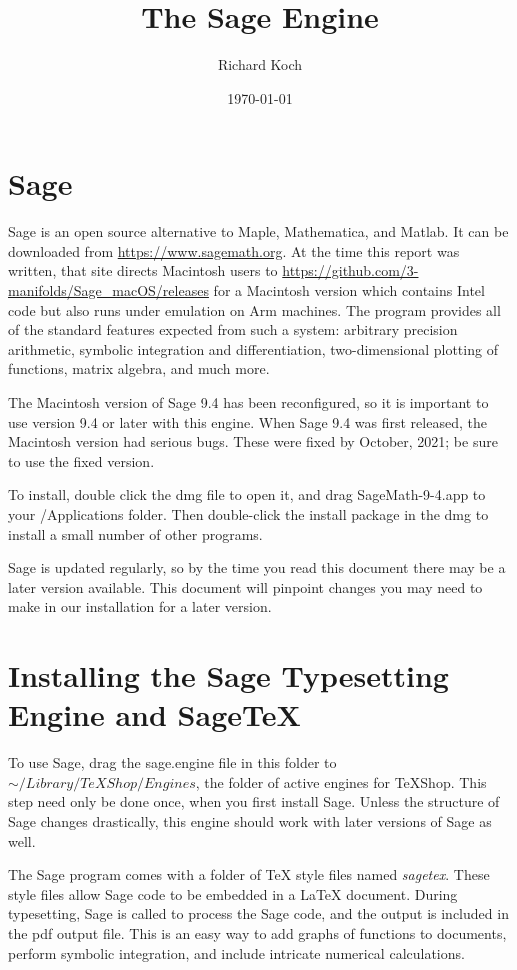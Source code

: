 \documentclass[11pt, oneside]{amsart}
\title{The Sage Engine}
\author{Richard Koch}
\date{\today}
\begin{document}
\maketitle
\vspace{-.3in}
\section{Sage}
Sage is an open source alternative to Maple, Mathematica, and Matlab. It can be downloaded from \url{https://www.sagemath.org}.
At the time this report was written, that site directs Macintosh users to   
\url{https://github.com/3-manifolds/Sage_macOS/releases} for a Macintosh version which contains  Intel code but also runs under emulation on Arm machines. The program provides all of the standard features expected from such a system: arbitrary precision arithmetic, symbolic integration and differentiation, two-dimensional plotting of functions, matrix algebra, and much more.

The Macintosh version of Sage 9.4 has been reconfigured, so it is important to use version 9.4 or later with this engine. When Sage 9.4 was first released, the Macintosh version had serious bugs. These were fixed by October, 2021; be sure to use the fixed version.

To install, double click the dmg file to open it, and drag SageMath-9-4.app to your /Applications folder. Then double-click the install package in the dmg to install a small number of other programs.

Sage is updated regularly, so by the time you read this document there may be a later version available. This document will pinpoint changes you may need to make in our installation for a later version.

\section{Installing the Sage Typesetting Engine and SageTeX}

To use Sage, drag  the sage.engine file in this folder to $\sim/Library/TeXShop/Engines$, the folder of active engines for TeXShop. This step need only be done once, when you first install Sage. Unless the structure of Sage changes drastically, this engine should work with later versions of Sage as well.

The Sage program comes with a folder of TeX style files named {\em sagetex}.  These style files allow Sage code to be embedded in a LaTeX document. During typesetting, Sage is called to process the Sage code, and the output is included in the pdf output file. This is an easy way to add graphs of functions to documents, perform symbolic integration, and include intricate numerical calculations. 
\end{document}
